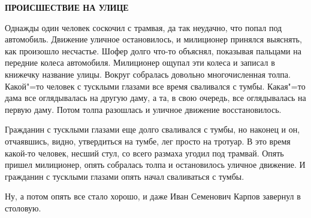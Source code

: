 \begin{center}
    \textbf{ПРОИСШЕСТВИЕ НА УЛИЦЕ}
\end{center}

Однажды один человек соскочил с трамвая, да так  неудачно,  что попал под автомобиль. Движение уличное остановилось, и  милиционер принялся выяснять, как  произошло несчастье. Шофер долго что-то объяснял, показывая пальцами на передние колеса автомобиля. Милиционер ощупал эти колеса и записал в   книжечку название улицы.  Вокруг  собралась  довольно многочисленная  толпа.  Какой"=то  человек  с тусклыми глазами все время сваливался с тумбы. Какая"=то дама все оглядывалась на другую даму, а та, в свою очередь, все оглядывалась на первую даму. Потом толпа разошлась и уличное движение восстановилось.
    
Гражданин с тусклыми  глазами еще  долго сваливался с тумбы, но наконец и он, отчаявшись, видно, утвердиться на тумбе, лег просто на тротуар. В это время какой-то человек, несший  стул, со всего  размаха  угодил  под трамвай. Опять пришел милиционер, опять собралась толпа и остановилось  уличное  движение.  И гражданин с  тусклыми глазами  опять начал сваливаться с тумбы.

Ну, а  потом  опять  все стало хорошо, и даже Иван Семенович Карпов завернул в столовую.